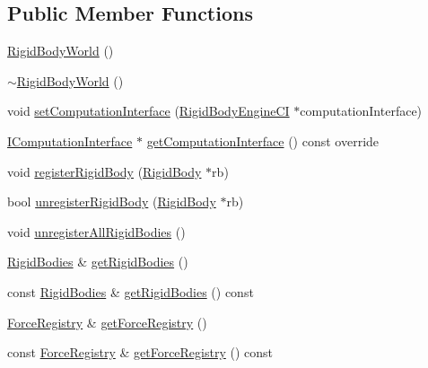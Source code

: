 \subsection*{Public Member Functions}
\begin{DoxyCompactItemize}
\item 
\mbox{\hyperlink{classrum_1_1_rigid_body_world_a4d35d17e3e0dd10b19e62175dba6074a}{Rigid\+Body\+World}} ()
\item 
\mbox{\hyperlink{classrum_1_1_rigid_body_world_ad3c644b75ec540c77eac4afdcb4fb894}{$\sim$\+Rigid\+Body\+World}} ()
\item 
void \mbox{\hyperlink{classrum_1_1_rigid_body_world_a9b96b7f69e773ab2c1ecc2060c7eec28}{set\+Computation\+Interface}} (\mbox{\hyperlink{classrum_1_1_rigid_body_engine_c_i}{Rigid\+Body\+Engine\+CI}} $\ast$computation\+Interface)
\item 
\mbox{\hyperlink{classrum_1_1_i_computation_interface}{I\+Computation\+Interface}} $\ast$ \mbox{\hyperlink{classrum_1_1_rigid_body_world_a0ab6763b69b3802d773c68209b0c4c24}{get\+Computation\+Interface}} () const override
\item 
void \mbox{\hyperlink{classrum_1_1_rigid_body_world_a237a70a84ab490a08cd83c18fb809a15}{register\+Rigid\+Body}} (\mbox{\hyperlink{classrum_1_1_rigid_body}{Rigid\+Body}} $\ast$rb)
\item 
bool \mbox{\hyperlink{classrum_1_1_rigid_body_world_acb0b8c2ef7429a8dd906209218704c0c}{unregister\+Rigid\+Body}} (\mbox{\hyperlink{classrum_1_1_rigid_body}{Rigid\+Body}} $\ast$rb)
\item 
void \mbox{\hyperlink{classrum_1_1_rigid_body_world_a8680993899244c60c59eaa3fe0ec4df7}{unregister\+All\+Rigid\+Bodies}} ()
\item 
\mbox{\hyperlink{classrum_1_1_rigid_body_world_a9604007b7513d401a9a92ae5d9be9425}{Rigid\+Bodies}} \& \mbox{\hyperlink{classrum_1_1_rigid_body_world_a7b2974169b0add2f3f113ab98d858a6a}{get\+Rigid\+Bodies}} ()
\item 
const \mbox{\hyperlink{classrum_1_1_rigid_body_world_a9604007b7513d401a9a92ae5d9be9425}{Rigid\+Bodies}} \& \mbox{\hyperlink{classrum_1_1_rigid_body_world_af3bb8e158d74093866c4a6ea614c4055}{get\+Rigid\+Bodies}} () const
\item 
\mbox{\hyperlink{classrum_1_1_force_registry}{Force\+Registry}} \& \mbox{\hyperlink{classrum_1_1_rigid_body_world_a86edb6c02c46063029468f33e5ba5ed0}{get\+Force\+Registry}} ()
\item 
const \mbox{\hyperlink{classrum_1_1_force_registry}{Force\+Registry}} \& \mbox{\hyperlink{classrum_1_1_rigid_body_world_a658404ecb3e0dcd9ef05ccc9f4a554d0}{get\+Force\+Registry}} () const
\end{DoxyCompactItemize}
